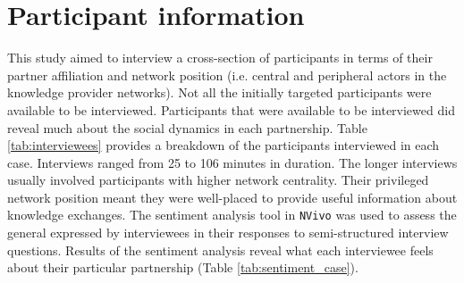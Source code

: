\section{Participant information}

This study aimed to interview a cross-section of participants in terms of their partner affiliation and network position (i.e. central and peripheral actors in the knowledge provider networks). Not all the initially targeted participants were available to be interviewed. Participants that were available to be interviewed did reveal much about the social dynamics in each partnership. Table \ref{tab:interviewees} provides a breakdown of the participants interviewed in each case. Interviews ranged from 25 to 106 minutes in duration. The longer interviews usually involved participants with higher network centrality. Their privileged network position meant they were well-placed to provide useful information about knowledge exchanges. The sentiment analysis tool in \texttt{NVivo\texttrademark} was used to assess the general expressed by interviewees in their responses to semi-structured interview questions. Results of the sentiment analysis reveal what each interviewee feels about their particular partnership (Table \ref{tab:sentiment_case}).


